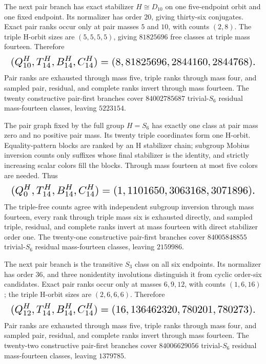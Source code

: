 \documentclass{article}
\newcommand{\fitmath}[1]{\resizebox{0.99\linewidth}{!}{$\displaystyle #1$}}
\begin{document}
The next pair branch has exact stabilizer $H\cong D_{10}$ on one five-endpoint
orbit and one fixed endpoint. Its normalizer has order $20$, giving thirty-six
conjugates. Exact pair ranks occur only at pair masses $5$ and $10$, with counts
$(2,8)$. The triple H-orbit sizes are $(5,5,5,5)$, giving $81825696$ free
classes at triple mass fourteen. Therefore
\begin{equation}
  \fitmath{%
    (Q^H_{10},T^H_{14},B^H_{14},C^H_{14})
      =(8,81825696,2844160,2844768).
  }
  \label{eq:optimization-crazy-sextuple-s6-pair-d10-51-ranking}
\end{equation}
Pair ranks are exhausted through mass five, triple ranks through mass four, and
sampled pair, residual, and complete ranks invert through mass fourteen. The
twenty constructive pair-first branches cover $84002785687$ trivial-$S_6$
residual mass-fourteen classes, leaving $5223154$.

The pair graph fixed by the full group $H=S_6$ has exactly one class at pair
mass zero and no positive pair mass. Its twenty triple coordinates form one
H-orbit. Equality-pattern blocks are ranked by an H stabilizer chain; subgroup
Mobius inversion counts only suffixes whose final stabilizer is the identity,
and strictly increasing scalar colors fill the blocks. Through mass fourteen
at most five colors are needed. Thus
\begin{equation}
  \fitmath{%
    (Q^H_0,T^H_{14},B^H_{14},C^H_{14})
      =(1,1101650,3063168,3071896).
  }
  \label{eq:optimization-crazy-sextuple-s6-pair-full-s6-breaking-ranking}
\end{equation}
The triple-free counts agree with independent subgroup inversion through mass
fourteen, every rank through triple mass six is exhausted directly, and sampled
triple, residual, and complete ranks invert at mass fourteen with direct
stabilizer order one. The twenty-one constructive pair-first branches cover
$84005848855$ trivial-$S_6$ residual mass-fourteen classes, leaving $2159986$.

The next pair branch is the transitive $S_3$ class on all six endpoints. Its
normalizer has order $36$, and three nonidentity involutions distinguish it from
cyclic order-six candidates. Exact pair ranks occur only at masses $6,9,12$,
with counts $(1,6,16)$; the triple H-orbit sizes are $(2,6,6,6)$. Therefore
\begin{equation}
  \fitmath{%
    (Q^H_{12},T^H_{14},B^H_{14},C^H_{14})
      =(16,136462320,780201,780273).
  }
  \label{eq:optimization-crazy-sextuple-s6-pair-transitive-s3-6-ranking}
\end{equation}
Pair ranks are exhausted through mass five, triple ranks through mass four, and
sampled pair, residual, and complete ranks invert through mass fourteen. The
twenty-two constructive pair-first branches cover $84006629056$ trivial-$S_6$
residual mass-fourteen classes, leaving $1379785$.
\end{document}
